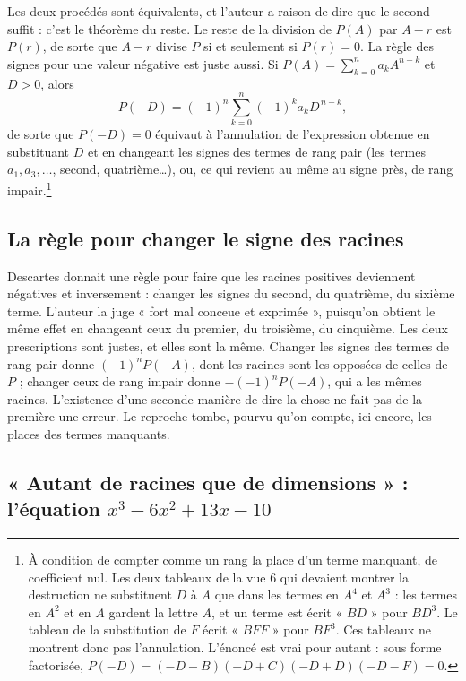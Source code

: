\documentclass[11pt,a4paper]{article}
\begin{document}
Les deux procédés sont équivalents, et l'auteur a raison de dire que le
second suffit : c'est le théorème du reste. Le reste de la division de \(P(A)\)
par \(A-r\) est \(P(r)\), de sorte que \(A-r\) divise \(P\) si et seulement si
\(P(r)=0\). La règle des signes pour une valeur négative est juste aussi. Si
\(P(A)=\sum_{k=0}^{n}a_kA^{n-k}\) et \(D>0\), alors
\[
P(-D)=(-1)^n\sum_{k=0}^{n}(-1)^k a_k D^{\,n-k},
\]
de sorte que \(P(-D)=0\) équivaut à l'annulation de l'expression obtenue en
substituant \(D\) et en changeant les signes des termes de rang pair (les
termes \(a_1, a_3, \dots\), second, quatrième…), ou, ce qui revient au même au
signe près, de rang impair.\footnote{À condition de compter comme un rang la
place d'un terme manquant, de coefficient nul. Les deux tableaux de la vue 6
qui devaient montrer la destruction ne substituent \(D\) à \(A\) que dans les
termes en \(A^4\) et \(A^3\) : les termes en \(A^2\) et en \(A\) gardent la
lettre \(A\), et un terme est écrit « \(BD\) » pour \(BD^3\). Le tableau de la
substitution de \(F\) écrit « \(BFF\) » pour \(BF^3\). Ces tableaux ne
montrent donc pas l'annulation. L'énoncé est vrai pour autant : sous forme
factorisée, \(P(-D)=(-D-B)(-D+C)(-D+D)(-D-F)=0\).}

\subsection*{La règle pour changer le signe des racines}

Descartes donnait une règle pour faire que les racines positives deviennent
négatives et inversement : changer les signes du second, du quatrième, du
sixième terme. L'auteur la juge « fort mal conceue et exprimée », puisqu'on
obtient le même effet en changeant ceux du premier, du troisième, du
cinquième. Les deux prescriptions sont justes, et elles sont la même. Changer
les signes des termes de rang pair donne \((-1)^nP(-A)\), dont les racines sont
les opposées de celles de \(P\) ; changer ceux de rang impair donne
\(-(-1)^nP(-A)\), qui a les mêmes racines. L'existence d'une seconde manière de
dire la chose ne fait pas de la première une erreur. Le reproche tombe, pourvu
qu'on compte, ici encore, les places des termes manquants.

\subsection*{« Autant de racines que de dimensions » : l'équation \(x^3-6x^2+13x-10\)}
\end{document}
